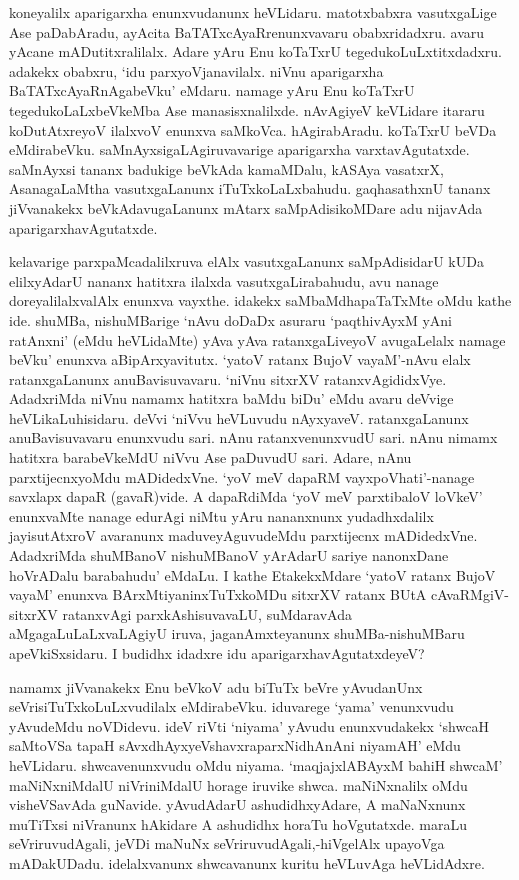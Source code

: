 koneyalilx aparigarxha enunxvudanunx heVLidaru. matotxbabxra vasutxgaLige Ase paDabAradu, ayAcita BaTATxcAyaRrenunxvavaru obabxridadxru. avaru yAcane mADutitxralilalx. Adare yAru Enu koTaTxrU tegedukoLuLxtitxdadxru. adakekx obabxru, `idu parxyoVjanavilalx. niVnu aparigarxha BaTATxcAyaRnAgabeVku' eMdaru. namage yAru Enu koTaTxrU tegedukoLaLxbeVkeMba Ase manasisxnalilxde. nAvAgiyeV keVLidare itararu koDutAtxreyoV ilalxvoV enunxva saMkoVca. hAgirabAradu. koTaTxrU beVDa eMdirabeVku. saMnAyxsigaLAgiruvavarige aparigarxha varxtavAgutatxde. saMnAyxsi tananx badukige beVkAda kamaMDalu, kASAya vasatxrX, AsanagaLaMtha vasutxgaLanunx iTuTxkoLaLxbahudu. gaqhasathxnU tananx jiVvanakekx beVkAdavugaLanunx mAtarx saMpAdisikoMDare adu nijavAda aparigarxhavAgutatxde.

kelavarige parxpaMcadalilxruva elAlx vasutxgaLanunx saMpAdisidarU kUDa elilxyAdarU nananx hatitxra ilalxda vasutxgaLirabahudu, avu nanage doreyalilalxvalAlx enunxva vayxthe. idakekx saMbaMdhapaTaTxMte oMdu kathe ide. shuMBa, nishuMBarige `nAvu doDaDx asuraru `paqthivAyxM yAni ratAnxni' (eMdu heVLidaMte) yAva yAva ratanxgaLiveyoV avugaLelalx namage beVku' enunxva aBipArxyavitutx. `yatoV ratanx BujoV vayaM'-nAvu elalx ratanxgaLanunx anuBavisuvavaru. `niVnu sitxrXV ratanxvAgididxVye. AdadxriMda niVnu namamx hatitxra baMdu biDu' eMdu avaru deVvige heVLikaLuhisidaru. deVvi `niVvu heVLuvudu nAyxyaveV. ratanxgaLanunx anuBavisuvavaru enunxvudu sari. nAnu ratanxvenunxvudU sari. nAnu nimamx hatitxra barabeVkeMdU niVvu Ase paDuvudU sari. Adare, nAnu parxtijecnxyoMdu mADidedxVne. `yoV meV dapaRM vayxpoVhati'-nanage savxlapx dapaR (gavaR)vide. A dapaRdiMda `yoV meV parxtibaloV loVkeV' enunxvaMte nanage edurAgi niMtu yAru nananxnunx yudadhxdalilx jayisutAtxroV avaranunx maduveyAguvudeMdu parxtijecnx mADidedxVne. AdadxriMda shuMBanoV nishuMBanoV yArAdarU sariye nanonxDane hoVrADalu barabahudu' eMdaLu. I kathe EtakekxMdare `yatoV ratanx BujoV vayaM' enunxva BArxMtiyaninxTuTxkoMDu sitxrXV ratanx BUtA cAvaRMgiV-sitxrXV ratanxvAgi parxkAshisuvavaLU, suMdaravAda aMgagaLuLaLxvaLAgiyU iruva, jaganAmxteyanunx shuMBa-nishuMBaru apeVkiSxsidaru. I budidhx idadxre idu aparigarxhavAgutatxdeyeV?

namamx jiVvanakekx Enu beVkoV adu biTuTx beVre yAvudanUnx seVrisiTuTxkoLuLxvudilalx eMdirabeVku. iduvarege `yama' venunxvudu yAvudeMdu noVDidevu. ideV riVti `niyama' yAvudu enunxvudakekx `shwcaH saMtoVSa tapaH sAvxdhAyxyeVshavxraparxNidhAnAni niyamAH' eMdu heVLidaru. shwcavenunxvudu oMdu niyama. `maqjajxlABAyxM bahiH shwcaM' maNiNxniMdalU niVriniMdalU horage iruvike shwca. maNiNxnalilx oMdu visheVSavAda guNavide. yAvudAdarU ashudidhxyAdare, A maNaNxnunx muTiTxsi niVranunx hAkidare A ashudidhx horaTu hoVgutatxde. maraLu seVriruvudAgali, jeVDi maNuNx seVriruvudAgali,-hiVgelAlx upayoVga mADakUDadu. idelalxvanunx shwcavanunx kuritu heVLuvAga heVLidAdxre.

